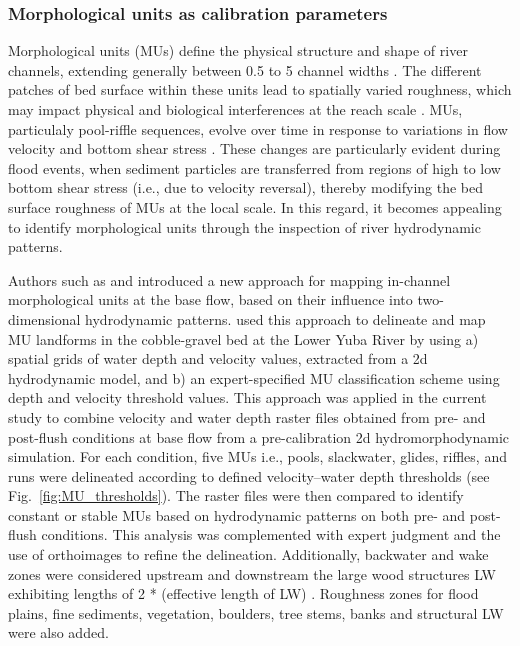 \documentclass[draft,linenumbers,onecolumn]{agujournal2019} %
\begin{document}
\subsubsection{Morphological units as calibration parameters}
\label{subsec:Sec2.5.1}
Morphological units (MUs) define the physical structure and shape of river channels, extending generally between 0.5 to 5 channel widths \cite{woodworth2022are}. The different patches of bed surface within these units lead to spatially varied roughness, which may impact physical and biological interferences at the reach scale \cite{buffington1999effects,dietrich2005sediment}. MUs, particulaly pool-riffle sequences, evolve over time in response to variations in flow velocity and bottom shear stress \cite{salmela2020morphological, pasternack2017flooddriven,cao2003flow}. These changes are particularly evident during flood events, when sediment particles are transferred from regions of high to low bottom shear stress (i.e., due to velocity reversal), thereby modifying the bed surface roughness of MUs at the local scale. In this regard, it becomes appealing to identify morphological units through the inspection of river hydrodynamic patterns. 

Authors such as  and  introduced a new approach for mapping in-channel morphological units at the base flow, based on their influence into two-dimensional hydrodynamic patterns.  used this approach to delineate and map MU landforms in the cobble-gravel bed at the Lower Yuba River by using a) spatial grids of water depth and velocity values, extracted from a 2d hydrodynamic model, and b) an expert-specified MU classification scheme using depth and velocity threshold values. This approach was applied in the current study to combine velocity and water depth raster files obtained from pre- and post-flush conditions at base flow from a pre-calibration 2d hydromorphodynamic simulation. For each condition, five MUs i.e., pools, slackwater, glides, riffles, and runs were delineated according to defined velocity–water depth thresholds (see Fig.~\ref{fig:MU_thresholds}). The raster files were then compared to identify constant or stable MUs based on hydrodynamic patterns on both pre- and post-flush conditions. This analysis was complemented with expert judgment and the use of orthoimages to refine the delineation. Additionally, backwater and wake  zones were considered upstream and downstream the large wood structures LW exhibiting lengths of 2 * (effective length of LW) \cite{scolari2025hydromorphodynamic}. Roughness zones for flood plains, fine sediments, vegetation, boulders, tree stems, banks and structural LW were also added.    
\end{document}
